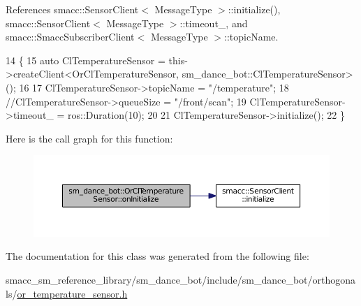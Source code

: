 References smacc\+::\+Sensor\+Client$<$ Message\+Type $>$\+::initialize(), smacc\+::\+Sensor\+Client$<$ Message\+Type $>$\+::timeout\+\_\+, and smacc\+::\+Smacc\+Subscriber\+Client$<$ Message\+Type $>$\+::topic\+Name.


\begin{DoxyCode}
14     \{
15         \textcolor{keyword}{auto} ClTemperatureSensor = this->createClient<OrClTemperatureSensor,
       sm\_dance\_bot::ClTemperatureSensor>();
16 
17         ClTemperatureSensor->topicName = \textcolor{stringliteral}{"/temperature"};
18         \textcolor{comment}{//ClTemperatureSensor->queueSize = "/front/scan";}
19         ClTemperatureSensor->timeout\_ = ros::Duration(10);
20 
21         ClTemperatureSensor->initialize();
22     \}
\end{DoxyCode}


Here is the call graph for this function\+:
\nopagebreak
\begin{figure}[H]
\begin{center}
\leavevmode
\includegraphics[width=350pt]{classsm__dance__bot_1_1OrClTemperatureSensor_adf83577acca3fd2193d6ca7ba0736484_cgraph}
\end{center}
\end{figure}




The documentation for this class was generated from the following file\+:\begin{DoxyCompactItemize}
\item 
smacc\+\_\+sm\+\_\+reference\+\_\+library/sm\+\_\+dance\+\_\+bot/include/sm\+\_\+dance\+\_\+bot/orthogonals/\hyperlink{or__temperature__sensor_8h}{or\+\_\+temperature\+\_\+sensor.\+h}\end{DoxyCompactItemize}
